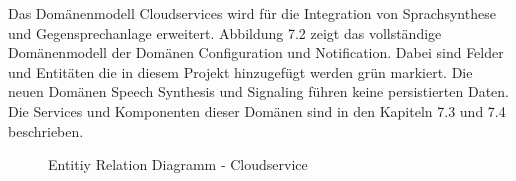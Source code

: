 Das Domänenmodell Cloudservices wird für die Integration von Sprachsynthese und Gegensprechanlage erweitert.
Abbildung 7.2 zeigt das vollständige Domänenmodell der Domänen Configuration und Notification.
Dabei sind Felder und Entitäten die in diesem Projekt hinzugefügt werden grün markiert.
Die neuen Domänen Speech Synthesis und Signaling führen keine persistierten Daten.
Die Services und Komponenten dieser Domänen sind in den Kapiteln 7.3 und 7.4 beschrieben.

\begin{figure}[h]
    \centering
    \begin{minipage}[b]{0.9\textwidth}
        \caption{Entitiy Relation Diagramm - Cloudservice}
    \end{minipage}
\end{figure}

\clearpage
